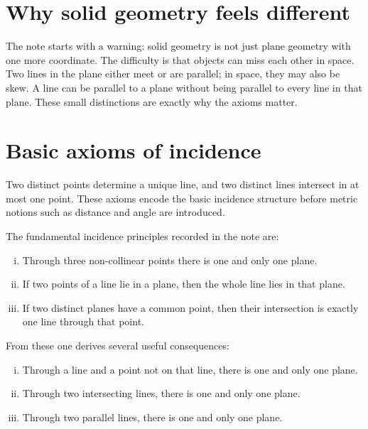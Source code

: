 
\section{Why solid geometry feels different}

The note starts with a warning: solid geometry is not just plane geometry with one more coordinate.  The difficulty is that objects can miss each other in space.  Two lines in the plane either meet or are parallel; in space, they may also be skew.  A line can be parallel to a plane without being parallel to every line in that plane.  These small distinctions are exactly why the axioms matter.

\section{Basic axioms of incidence}

\begin{axiom}
Two distinct points determine a unique line, and two distinct lines intersect in at most one point.  These axioms encode the basic incidence structure before metric notions such as distance and angle are introduced.
\end{axiom}


The fundamental incidence principles recorded in the note are:
\begin{enumerate}[(i)]
  \item Through three non-collinear points there is one and only one plane.
  \item If two points of a line lie in a plane, then the whole line lies in that plane.
  \item If two distinct planes have a common point, then their intersection is exactly one line through that point.
\end{enumerate}

From these one derives several useful consequences:
\begin{enumerate}[(i)]
  \item Through a line and a point not on that line, there is one and only one plane.
  \item Through two intersecting lines, there is one and only one plane.
  \item Through two parallel lines, there is one and only one plane.
\end{enumerate}

